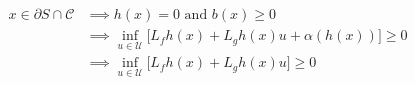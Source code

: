 \documentclass[preview]{standalone}
\begin{document}
\begin{align*}
x \in \partial S \cap \mathcal{C} &\implies h(x) = 0 \text{ and } b(x) \geq 0\\ &\implies \inf_{u \in \mathcal{U}} \big [ L_fh(x) + L_gh(x) u + \alpha(h(x)) \big] \geq 0\\ &\implies \inf_{u \in \mathcal{U}} \big [ L_fh(x) + L_gh(x) u \big] \geq 0\\
\end{align*}
\end{document}
